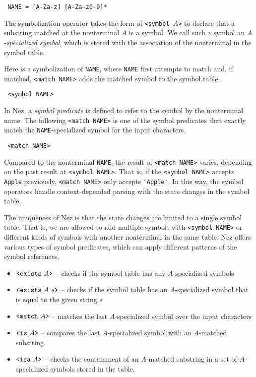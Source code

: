 \documentclass[preprint]{sigplanconf}
\begin{document}
\begin{verbatim}
 NAME = [A-Za-z] [A-Za-z0-9]*
\end{verbatim}

The symbolization operator takes the form of \verb|<symbol |$A$\verb|>| to declare that a substring matched at the nonterminal $A$ is a symbol. We call such a symbol an $A$-{\em specialized symbol}, which is stored with the association of the nonterminal in the symbol table. 

Here is a symbolization of {\tt NAME}, where  {\tt NAME} first attempts to match and, if matched, {\small \verb|<match NAME>|} adds the matched symbol to the symbol table. 

\begin{verbatim}
 <symbol NAME>
\end{verbatim}

In Nez, a {\em symbol predicate} is defined to refer to the symbol by the nonterminal name. The following {\small \verb|<match NAME>|} is one of the symbol predicates that exactly match the \verb|NAME|-specialized symbol for the input characters. 

\begin{verbatim}
 <match NAME>
\end{verbatim}

Compared to the nonterminal {\tt NAME}, the result of \verb|<match NAME>| varies, depending on the past result at \verb|<symbol NAME>|. That is, if the \verb|<symbol NAME>| accepts {\tt Apple} previously, \verb|<match NAME>| only accepts \verb|'Apple'|. In this way, the symbol operators handle context-depended parsing with the state changes in the symbol table.

The uniqueness of Nez is that the state changes are limited to a single symbol table. That is, we are allowed to add multiple symbols with \verb|<symbol NAME>| or different kinds of symbols with another nonterminal in the same table. Nez offers various types of symbol predicates, which can apply different patterns of the symbol references.

\begin{itemize}
\item {\small $\verb|<exists|~A \verb|>|$} -- checks if the symbol table has any $A$-specialized symbols
\item {\small $\verb|<exists|~A~s \verb|>|$} -- checks if the symbol table has an $A$-specialized symbol that is equal to the given string $s$ 
\item {\small $\verb|<match|~A \verb|>|$} -- matches the last $A$-specialized symbol over the input characters
\item {\small $\verb|<is|~A \verb|>|$} -- compares the last $A$-specialized symbol with an $A$-matched substring.
\item {\small $\verb|<isa|~A \verb|>|$} -- checks the containment of an $A$-matched substring in a set of $A$-specialized symbols stored in the table. 
\end{itemize}
\end{document}
